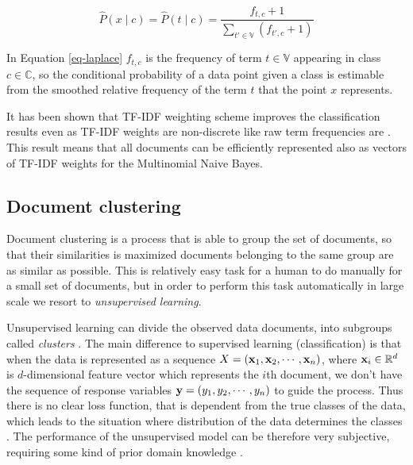 \begin{equation} \label{eq-laplace}
    \hat{P}(x \mid c) = \hat{P}(t \mid c) = \dfrac{f_{t, c} + 1}{\sum \limits_{t' \in \mathbb{V}} (f_{t', c} + 1)} 
\end{equation}

\noindent
In Equation \ref{eq-laplace} $f_{t, c}$ is the frequency of term $t \in \mathbb{V}$ appearing in class $c \in \mathbb{C}$, so the conditional probability of a data point given a class is estimable from the smoothed relative frequency of the term $t$ that the point $x$ represents. 

It has been shown that TF-IDF weighting scheme improves the classification results even as TF-IDF weights are non-discrete like raw term frequencies are \cite{Kibriya:2004:MNB:2146834.2146882}. This result means that all documents can be efficiently represented also as vectors of TF-IDF weights for the Multinomial Naive Bayes.


\subsection{Document clustering}

Document clustering is a process that is able to group the set of documents, so that their similarities is maximized \ie documents belonging to the same group are as similar as possible. This is relatively easy task for a human to do manually for a small set of documents, but in order to perform this task automatically in large scale we resort to \emph{unsupervised learning}. 

Unsupervised learning can divide the observed data \ie documents, into subgroups called \emph{clusters} \cite{hastie_09_elements-of.statistical-learning}. The main difference to supervised learning (classification) is that when the data is represented as a sequence $X = (\mathbf{x}_1, \mathbf{x}_2, \cdots, \mathbf{x}_n)$, where $\mathbf{x}_i \in \mathbb{R}^d$ is $d$-dimensional feature vector which represents the $i$th document, we don't have the sequence of response variables $\mathbf{y} = (y_1, y_2, \cdots, y_n)$ to guide the process. Thus there is no clear loss function, that is dependent from the true classes of the data, which leads to the situation where distribution of the data determines the classes \cite{Manning:2008:IIR:1394399}. The performance of the unsupervised model can be therefore very subjective, requiring some kind of prior domain knowledge \cite{hastie_09_elements-of.statistical-learning}. 

